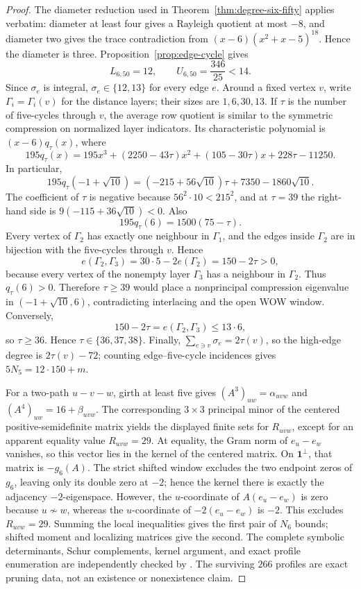 \documentclass[a4paper,10pt,reqno]{amsart}
\theoremstyle{plain}
\theoremstyle{definition}
\theoremstyle{remark}
\newcommand{\one}{\mathbf 1}
\newcommand{\RepoTag}{v2.2.8}
\newcommand{\codefile}[1]{%
  \href{https://github.com/SamPetkov/wow284/blob/\RepoTag/#1}{\path{#1}}}
\begin{document}
\begin{proof}
The diameter reduction used in Theorem~\ref{thm:degree-six-fifty} applies
verbatim: diameter at least four gives a Rayleigh quotient at most \(-8\), and
diameter two gives the trace contradiction from
\((x-6)(x^2+x-5)^{18}\).  Hence the diameter is three.
Proposition~\ref{prop:edge-cycle} gives
\[
 L_{6,50}=12,\qquad U_{6,50}=\frac{346}{25}<14.
\]
Since \(\sigma_e\) is integral, \(\sigma_e\in\{12,13\}\) for every edge
\(e\).  Around a fixed vertex \(v\), write
\(\Gamma_i=\Gamma_i(v)\) for the distance layers; their sizes are
\(1,6,30,13\).  If \(\tau\) is the number of
five-cycles through \(v\), the average row quotient is similar to the
symmetric compression on normalized layer indicators.  Its characteristic
polynomial is \((x-6)q_\tau(x)\), where
\[
 195q_\tau(x)
 =195x^3+(2250-43\tau)x^2+(105-30\tau)x+228\tau-11250.
\]
In particular,
\[
 195q_\tau(-1+\sqrt{10})
 =(-215+56\sqrt{10})\tau+7350-1860\sqrt{10}.
\]
The coefficient of \(\tau\) is negative because
\(56^2\cdot10<215^2\), and at \(\tau=39\) the right-hand side is
\(9(-115+36\sqrt{10})<0\).  Also
\[
 195q_\tau(6)=1500(75-\tau).
\]
Every vertex of \(\Gamma_2\) has exactly one neighbour in \(\Gamma_1\), and
the edges inside \(\Gamma_2\) are in bijection with the five-cycles through
\(v\).  Hence
\[
 e(\Gamma_2,\Gamma_3)
 =30\cdot5-2e(\Gamma_2)
 =150-2\tau>0,
\]
because every vertex of the nonempty layer \(\Gamma_3\) has a neighbour in
\(\Gamma_2\).  Thus \(q_\tau(6)>0\).  Therefore \(\tau\ge39\) would place a
nonprincipal compression eigenvalue in
\((-1+\sqrt{10},6)\), contradicting interlacing and the open WOW window.
Conversely,
\[
 150-2\tau=e(\Gamma_2,\Gamma_3)\le13\cdot6,
\]
so \(\tau\ge36\).  Hence \(\tau\in\{36,37,38\}\).  Finally,
\(\sum_{e\ni v}\sigma_e=2\tau(v)\), so the high-edge degree is
\(2\tau(v)-72\); counting edge--five-cycle incidences gives
\(5N_5=12\cdot150+m\).

For a two-path \(u-v-w\), girth at least five gives
\((A^3)_{uw}=\alpha_{uvw}\) and
\((A^4)_{uw}=16+\beta_{uvw}\).  The corresponding \(3\times3\) principal
minor of the centered positive-semidefinite matrix yields the displayed finite
sets for \(R_{uvw}\), except for an apparent equality value \(R_{uvw}=29\).
At equality, the Gram norm of \(e_u-e_w\) vanishes, so this vector lies in
the kernel of the centered matrix.  On \(\one^\perp\), that matrix is
\(-g_6(A)\).  The strict shifted window excludes the two endpoint zeros of
\(g_6\), leaving only its double zero at \(-2\); hence the kernel there is
exactly the adjacency \(-2\)-eigenspace.  However, the \(u\)-coordinate of
\(A(e_u-e_w)\) is zero because \(u\not\sim w\), whereas the
\(u\)-coordinate of \(-2(e_u-e_w)\) is \(-2\).  This excludes
\(R_{uvw}=29\).  Summing the local inequalities gives the first pair of
\(N_6\) bounds; shifted moment and localizing matrices give the second.
The complete symbolic determinants, Schur complements, kernel argument, and
exact profile enumeration are independently checked by
\codefile{scripts/verify_proof_audit_06_order50_feasibility.py}.  The
surviving \(266\) profiles are exact pruning data, not an existence or
nonexistence claim.
\end{proof}
\end{document}
